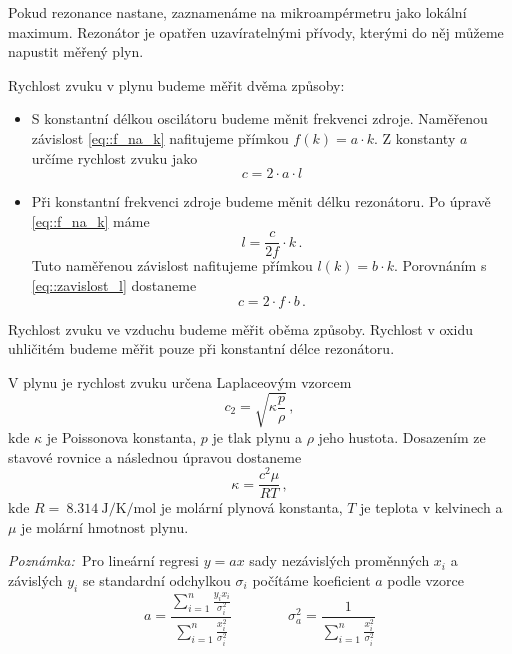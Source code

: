 Pokud rezonance nastane, zaznamenáme na mikroampérmetru jako lokální maximum.
Rezonátor je opatřen uzavíratelnými přívody, kterými do něj můžeme napustit měřený plyn.

Rychlost zvuku v plynu budeme měřit dvěma způsoby:
\begin{itemize}
\item S konstantní délkou oscilátoru budeme měnit frekvenci zdroje. Naměřenou závislost \eqref{eq::f_na_k} nafitujeme přímkou $f(k) = a \cdot k$. Z konstanty $a$ určíme rychlost zvuku jako
\begin{equation} \label{eq::cza}
c = 2 \cdot a \cdot l
\end{equation}
\item Při konstantní frekvenci zdroje budeme měnit délku rezonátoru. Po úpravě \eqref{eq::f_na_k} máme
\begin{equation} \label{eq::zavislost_l}
l= \frac{c}{2f} \cdot k  \,.
\end{equation}
Tuto naměřenou závislost nafitujeme přímkou $l(k)= b \cdot k$. Porovnáním s \eqref{eq::zavislost_l} dostaneme
\begin{equation} \label{eq::czb}
c = 2 \cdot f \cdot b \,.
\end{equation}
\end{itemize}

Rychlost zvuku ve vzduchu budeme měřit oběma způsoby.
Rychlost v oxidu uhličitém budeme měřit pouze při konstantní délce rezonátoru.

V plynu je rychlost zvuku určena Laplaceovým vzorcem \cite{ZFP}
\begin{equation}
c_2 = \sqrt{\kappa \frac{p}{\rho}} \,,
\end{equation}
kde $\kappa$ je Poissonova konstanta, $p$ je tlak plynu a $\rho$ jeho hustota.
Dosazením ze stavové rovnice a následnou úpravou dostaneme
\begin{equation} \label{eq::kappa}
\kappa = \frac{c^2 \mu}{RT} \,,
\end{equation}
kde $R=~\SI{8.314}{\joule\per\kelvin\per\mole}$ je molární plynová konstanta, $T$ je teplota v kelvinech a $\mu$ je molární hmotnost plynu.

\emph{Poznámka:~}Pro lineární regresi $y = ax$ sady nezávislých proměnných $x_i$ a závislých $y_i$ se standardní odchylkou $\sigma_i$ počítáme koeficient $a$ podle vzorce \cite{prakt}
\begin{equation}
a=\frac{ \sum_{i=1}^{n} \frac{y_ix_i}{\sigma_i^2}
}{\sum_{i=1}^{n} \frac{x_i^2}{\sigma_i^2}  }
 \qquad \qquad \sigma_a^2=\frac{1}{
 \sum_{i=1}^{n} \frac{x_i^2}{\sigma_i^2}}
\end{equation}

